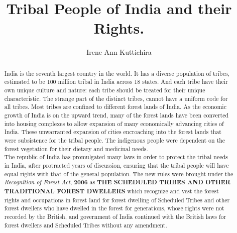 \documentclass[]{article}
\title{Tribal People of India and their Rights.}
\author{Irene Ann Kuttichira}
\begin{document}
\maketitle

\begin{abstract}
\parskip=12pt
\setlength{\parindent}{15pt}
India is the seventh largest country in the world.  It has a diverse population of tribes, estimated to be 100 million tribal in India across 18 states.  And each tribe have their own unique culture and nature: each tribe should be treated for their unique characteristic. The strange part of the distinct tribes, cannot have a uniform code for all tribes.   Most tribes are confined to different forest lands of India.  As the economic growth of India is on the upward trend, many of the forest lands have been converted into housing complexes to allow expansion of many economically advancing cities of India.  These unwarranted expansion of cities encroaching into the forest lands that were subsistence for the tribal people.  The indigenous people were dependent on the forest vegetation for their dietary and medicinal needs.\newline
\vspace{3ex}\\   %
\hspace{15pt}The republic of India has promulgated many laws in order to protect the tribal needs in India, after protracted years of discussion, ensuring that the tribal people will have equal rights with that of the general population.  The new rules were brought under the \textit{Recognition of Forest Act}, \textbf{2006} as \textbf{THE SCHEDULED TRIBES AND OTHER TRADITIONAL FOREST DWELLERS } which recognize and vest the forest rights and occupations in forest land for forest dwelling of Scheduled Tribes and other forest dwellers who have dwelled in the forest for generations, whose rights were not recorded by the British, and government of India continued with the British laws for forest dwellers and Scheduled Tribes without any amendment. 
\end{abstract}
\end{document}
